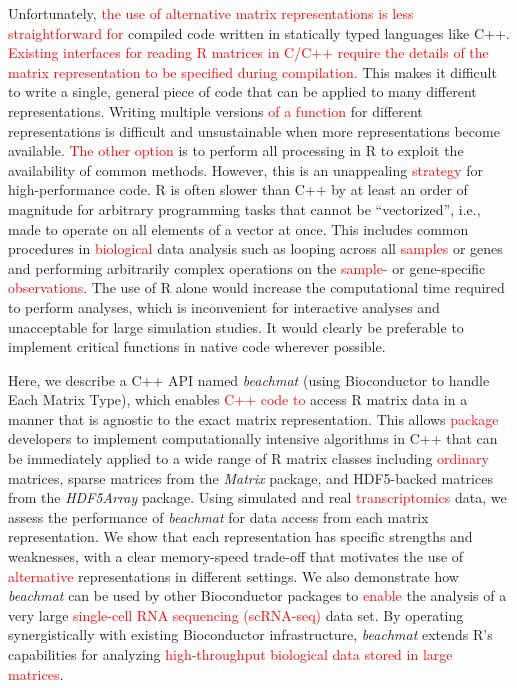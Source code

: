 \documentclass[10pt,letterpaper]{article}
\newcommand{\beachmat}{\textit{beachmat}}
\newcommand{\revised}[1]{\textcolor{red}{#1}}
\begin{document}
Unfortunately, \revised{the use of alternative matrix representations is less straightforward for} compiled code written in statically typed languages like C++.
\revised{Existing interfaces for reading R matrices in C/C++ require the details of the matrix representation to be specified during compilation.}
This makes it difficult to write a single, general piece of code that can be applied to many different representations.
Writing multiple versions \revised{of a function} for different representations is difficult and unsustainable when more representations become available.
\revised{The other option} is to perform all processing in R to exploit the availability of common methods.
However, this is an unappealing \revised{strategy} for high-performance code.
R is often slower than C++ by at least an order of magnitude for arbitrary programming tasks that cannot be ``vectorized'', i.e., made to operate on all elements of a vector at once.
This includes common procedures in \revised{biological} data analysis such as looping across all \revised{samples} or genes and performing arbitrarily complex operations on the \revised{sample-} or gene-specific \revised{observations}.
The use of R alone would increase the computational time required to perform analyses, which is inconvenient for interactive analyses and unacceptable for large simulation studies.
It would clearly be preferable to implement critical functions in native code wherever possible.


Here, we describe a C++ API named \beachmat{} (using Bioconductor to handle Each Matrix Type), which enables \revised{C++ code to} access R matrix data in a manner that is agnostic to the exact matrix representation.
This allows \revised{package} developers to implement computationally intensive algorithms in C++ that can be immediately applied to a wide range of R matrix classes including \revised{ordinary} matrices, sparse matrices from the \textit{Matrix} package, and HDF5-backed matrices from the \textit{HDF5Array} package.
Using simulated and real \revised{transcriptomics} data, we assess the performance of \beachmat{} for data access from each matrix representation.
We show that each representation has specific strengths and weaknesses, with a clear memory-speed trade-off that motivates the use of \revised{alternative} representations in different settings.
We also demonstrate how \beachmat{} can be used by other Bioconductor packages to \revised{enable} the analysis of a very large \revised{single-cell RNA sequencing (scRNA-seq)} data set. 
By operating synergistically with existing Bioconductor infrastructure, \beachmat{} extends R's capabilities for analyzing \revised{high-throughput biological data stored in large matrices}.
\end{document}

